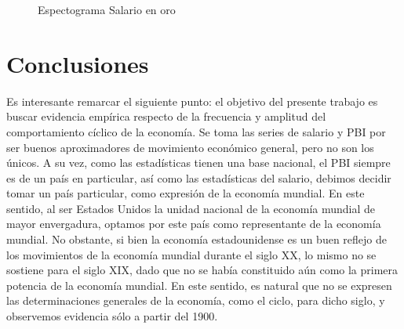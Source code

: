 \documentclass[a4paper]{article}
\begin{document}
\begin{figure}[H]
	\centering
	\caption{Espectograma Salario en oro} \label{fig:espect_wg}
\end{figure}



\section{Conclusiones}


Es interesante remarcar el siguiente punto: el objetivo del presente trabajo es buscar evidencia empírica respecto de la frecuencia y amplitud del comportamiento cíclico de la economía. Se toma las series de salario y PBI por ser buenos aproximadores de movimiento económico general, pero no son los únicos. A su vez, como las estadísticas tienen una base nacional, el PBI siempre es de un país en particular, así como las estadísticas del salario, debimos decidir tomar un país particular, como expresión de la economía mundial. En este sentido, al ser Estados Unidos la unidad nacional de la economía mundial de mayor envergadura, optamos por este país como representante de la economía mundial. No obstante, si bien la economía estadounidense es un buen reflejo de los movimientos de la economía mundial durante el siglo XX, lo mismo no se sostiene para el siglo XIX, dado que no se había constituido aún como la primera potencia de la economía mundial. En este sentido, es natural que no se expresen las determinaciones generales de la economía, como el ciclo, para dicho siglo, y observemos evidencia sólo a partir del 1900.



\end{document}
